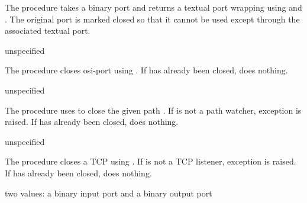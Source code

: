 The  procedure takes a binary port  and
returns a textual port wrapping  using
 and . The
original port  is marked closed so that it cannot be used
except through the associated textual port.

\begin{procedure}
\end{procedure}
\returns{} unspecified

The  procedure closes osi-port  using
. If  has already been closed,
 does nothing.

\begin{procedure}
\end{procedure}
\returns{} unspecified

The  procedure uses
 to close the given path
. If  is not a path
watcher, exception 
is raised. If  has already been closed,
 does nothing.

\begin{procedure}
\end{procedure}
\returns{} unspecified

The  procedure closes a TCP
 using
.  If  is not a TCP
listener, exception  is raised. If  has already been
closed,  does nothing.

\begin{procedure}
\end{procedure}
\returns{} two values: a binary input port and a binary output port

